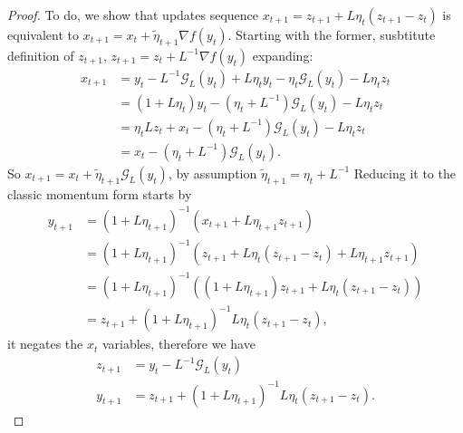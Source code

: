 \documentclass[12pt]{article}
\begin{document}
            \begin{proof}
                To do, we show that updates sequence $x_{t + 1} = z_{t + 1} + L\eta_t (z_{t + 1} - z_t)$ is equivalent to $x_{t + 1} = x_t + \tilde\eta_{t + 1}\nabla f(y_t)$. 
                Starting with the former, susbtitute definition of $z_{t + 1}$, $z_{t + 1} = z_t + L^{-1}\nabla f(y_t)$ expanding: 
                \begin{align*}
                    x_{t + 1} &= y_t - L^{-1}\mathcal G_L(y_t) 
                    + L \eta_t y_t - \eta_t \mathcal G_L(y_t) - L\eta_t z_t
                    \\
                    &= 
                    (1 + L\eta_t)y_t - (\eta_t + L^{-1})\mathcal G_L(y_t) - L\eta_t z_t
                    \\
                    &= \eta_t Lz_t + x_t -(\eta_t + L^{-1}) \mathcal G_L(y_t)  - L\eta_t z_t
                    \\
                    &= x_t - (\eta_t + L^{-1})\mathcal G_L(y_t). 
                \end{align*}
                So $x_{t + 1} = x_t + \tilde \eta_{t + 1}\mathcal G_L(y_t)$, by assumption $\tilde \eta_{t + 1} = \eta_t + L^{-1}$
                Reducing it to the classic momentum form starts by 
                \begin{align*}
                    y_{t + 1} &= (1 + L\eta_{t + 1})^{-1} (x_{t + 1} + L\eta_{t + 1}z_{t + 1})
                    \\
                    &= (1 + L\eta_{t + 1})^{-1} (
                        z_{t + 1} + L\eta_t (z_{t + 1} - z_t) + L\eta_{t + 1} z_{t + 1}
                    )
                    \\
                    &= 
                    (1 + L\eta_{t + 1})^{-1} (
                        (1 + L\eta_{t + 1})z_{t + 1} + L\eta_t(z_{t + 1} - z_t)
                    )
                    \\
                    &= z_{t + 1} + (1 + L\eta_{t + 1})^{-1}L\eta_t (z_{t + 1} - z_t), 
                \end{align*}
                it negates the $x_t$ variables, therefore we have 
                \begin{align*}
                    z_{t + 1} &= y_t - L^{-1} \mathcal G_L (y_t)
                    \\
                    y_{t + 1} &= z_{t + 1} + (1 + L\eta_{t + 1})^{-1}L\eta_t (z_{t + 1} - z_t).
                \end{align*}
            \end{proof}
\end{document}
